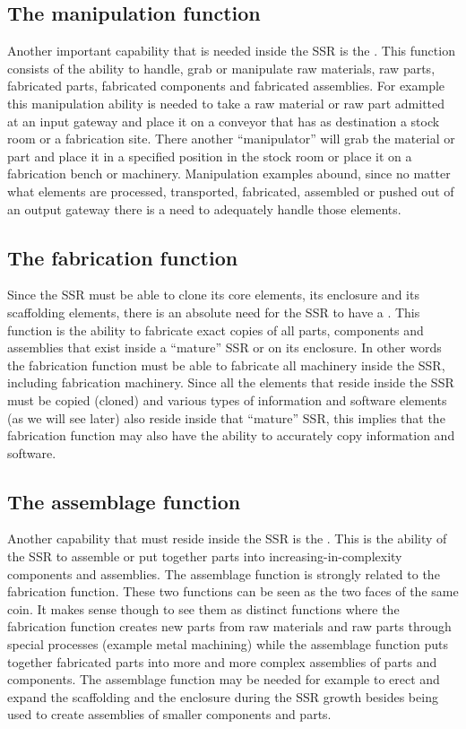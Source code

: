 \subsection[The manipulation function]{The manipulation function}
Another important capability that
is needed inside the SSR is the . This
function consists of the ability to handle, grab or manipulate raw
materials, raw parts, fabricated parts, fabricated components and
fabricated assemblies. For example this manipulation ability is needed
to take a raw material or raw part admitted at an input gateway and
place it on a conveyor that has as destination a stock room or a
fabrication site. There another “manipulator” will grab the material or
part and place it in a specified position in the stock room or place it
on a fabrication bench or machinery. Manipulation examples abound,
since no matter what elements are processed, transported, fabricated,
assembled or pushed out of an output gateway there is a need to
adequately handle those elements.

\subsection[The fabrication function]{The fabrication function}

Since the SSR must be able to
clone its core elements, its enclosure and its scaffolding elements,
there is an absolute need for the SSR to have a . 
This function is the ability to fabricate exact copies of
all parts, components and assemblies that exist inside a “mature” SSR
or on its enclosure. In other words the fabrication function must be
able to fabricate all machinery inside the SSR, including fabrication
machinery. Since all the elements that reside inside the SSR must be
copied (cloned) and various types of information and software elements
(as we will see later) also reside inside that “mature” SSR, this implies
that the fabrication function may also have the ability to
accurately copy information and software.

\subsection[The assemblage function]{The assemblage function}

Another capability that must
reside inside the SSR is the . This is the
ability of the SSR to assemble or put together parts into
increasing-in-complexity components and assemblies. The assemblage
function is strongly related to the fabrication function. These two
functions can be seen as the two faces of the same coin. It makes sense
though to see them as distinct functions where the fabrication function
creates new parts from raw materials and raw parts through special
processes (example metal machining) while the assemblage function puts
together fabricated parts into more and more complex assemblies of
parts and components. The assemblage function may be needed for example
to erect and expand the scaffolding and the enclosure during the SSR
growth besides being used to create assemblies of smaller components
and parts.

